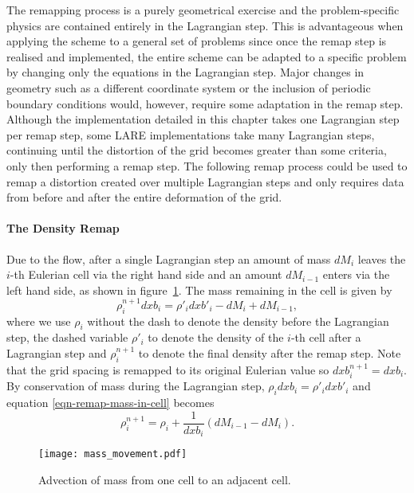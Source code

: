 The remapping process is a purely geometrical exercise and the problem-specific physics are contained entirely in the Lagrangian step. This is advantageous when applying the scheme to a general set of problems since once the remap step is realised and implemented, the entire scheme can be adapted to a specific problem by changing only the equations in the Lagrangian step. Major changes in geometry such as a different coordinate system or the inclusion of periodic boundary conditions would, however, require some adaptation in the remap step. Although the implementation detailed in this chapter takes one Lagrangian step per remap step, some LARE implementations take many Lagrangian steps, continuing until the distortion of the grid becomes greater than some criteria, only then performing a remap step. The following remap process could be used to remap a distortion created over multiple Lagrangian steps and only requires data from before and after the entire deformation of the grid. 

\paragraph{The Density Remap}
Due to the flow, after a single Lagrangian step an amount of mass $dM_i$ leaves the $i$-th Eulerian cell via the right hand side and an amount $dM_{i-1}$ enters via the left hand side, as shown in figure~\ref{fig:mass_movement}. The mass remaining in the cell is given by
\begin{equation}
  \rho^{n+1}_i dxb_i = \rho'_i dxb'_i - dM_i + dM_{i-1},
  \label{eqn-remap-mass-in-cell}
\end{equation}
where we use $\rho_i$ without the dash to denote the density before the Lagrangian step, the dashed variable $\rho'_i$ to denote the density of the $i$-th cell after a Lagrangian step and $\rho_i^{n+1}$ to denote the final density after the remap step. Note that the grid spacing is remapped to its original Eulerian value so $dxb^{n+1}_i = dxb_i$. By conservation of mass during the Lagrangian step, $\rho_i dxb_i = \rho'_i dxb'_i$ and equation \eqref{eqn-remap-mass-in-cell} becomes
\begin{equation}
  \rho^{n+1}_i = \rho_i + \frac{1}{dxb_i} (dM_{i-1} - dM_i).
  \label{eqn-remap-density}
\end{equation}

\begin{figure}[t]
  \centering
  \texttt{[image: mass\_movement.pdf]}
  \caption{Advection of mass from one cell to an adjacent cell.}%
  \label{fig:mass_movement}
\end{figure}

